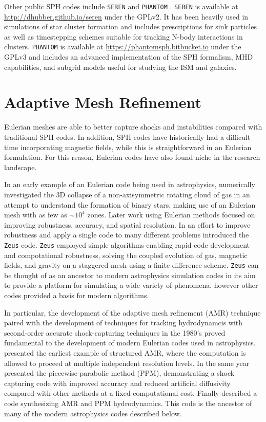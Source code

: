 \documentclass[11pt,twoside]{article}
\begin{document}
Other public SPH codes include \texttt{SEREN} \citep{hubber2011}  and \texttt{PHANTOM} \citep{price2017}. \texttt{SEREN} is available at \url{http://dhubber.github.io/seren} under the GPLv2. It has been heavily used in simulations of star cluster formation and includes prescriptions for sink particles \citep{walch2013} as well as timestepping schemes suitable for tracking N-body interactions in clusters. \texttt{PHANTOM} is available at \url{https://phantomsph.bitbucket.io} under the GPLv3 and includes an advanced implementation of the SPH formalism, MHD capabilities, and subgrid models useful for studying the ISM and galaxies.

\section{Adaptive Mesh Refinement}
\label{amr}

Eulerian meshes are able to better capture shocks and instabilities compared with traditional SPH codes. In addition, SPH codes have historically had a difficult time incorporating magnetic fields, while this is straightforward in an Eulerian formulation. For this reason, Eulerian codes have also found niche in the research landscape.

In an early example of an Eulerian code being used in astrophysics, \citet{boss1979} numerically investigated the 3D collapse of a non-axisymmetric rotating cloud of gas in an attempt to understand the formation of binary stars, making use of an Eulerian mesh with as few as ${\sim}10^4$ zones. Later work using Eulerian methods focused on improving robustness, accuracy, and spatial resolution. In an effort to improve robustness and apply a single code to many different problems \citet{stone1992} introduced the \texttt{Zeus} code. \texttt{Zeus} employed simple algorithms enabling rapid code development and compotational robustness, solving the coupled evolution of gas, magnetic fields, and gravity on a staggered mesh using a finite difference scheme. \texttt{Zeus} can be thought of as an ancestor to modern astrophysics simulation codes in its aim to provide a platform for simulating a wide variety of phenomena, however other codes provided a basis for modern algorithms.

In particular, the development of the adaptive mesh refinement (AMR) technique paired with the development of techniques for tracking hydrodynamcis with second-order accurate shock-capturing techniques in the 1980's proved fundamental to the development of modern Eulerian codes used in astrophysics. \citet{berger1984} presented the earliest example of structured AMR, where the computation is allowed to proceed at multiple independent resolution levels. In the same year \citet{colella1984} presented the piecewise parabolic method (PPM), demonstrating a shock capturing code with improved accuracy and reduced artificial diffusivity compared with other methods at a fixed computational cost. Finally \citet{berger1989} described a code synthesizing AMR and PPM hydrodynamics. This code is the ancestor of many of the modern astrophysics codes described below.
\end{document}
